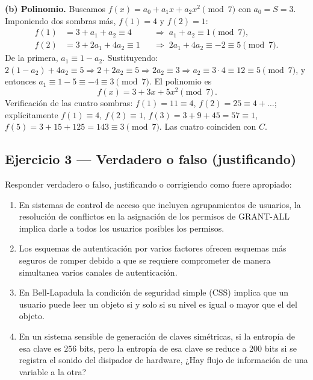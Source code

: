 \medskip
\textbf{(b) Polinomio.} Buscamos $f(x) = a_0 + a_1 x + a_2 x^2 \pmod 7$ con $a_0 = S = 3$.
Imponiendo dos sombras más, $f(1)=4$ y $f(2)=1$:
\begin{align*}
  f(1) &= 3 + a_1 + a_2 \equiv 4 &&\Rightarrow\; a_1 + a_2 \equiv 1 \pmod 7,\\
  f(2) &= 3 + 2a_1 + 4a_2 \equiv 1 &&\Rightarrow\; 2a_1 + 4a_2 \equiv -2 \equiv 5 \pmod 7.
\end{align*}
De la primera, $a_1 \equiv 1 - a_2$. Sustituyendo:
$2(1-a_2) + 4a_2 \equiv 5 \Rightarrow 2 + 2a_2 \equiv 5 \Rightarrow 2a_2 \equiv 3
\Rightarrow a_2 \equiv 3\cdot 4 \equiv 12 \equiv 5 \pmod 7$, y entonces
$a_1 \equiv 1 - 5 \equiv -4 \equiv 3 \pmod 7$. El polinomio es
\begin{equation}
  \boxed{\,f(x) = 3 + 3x + 5x^2 \pmod 7\,}.
\end{equation}
Verificación de las cuatro sombras: $f(1)=11\equiv4$, $f(2)=25\equiv4{+}\dots$;
explícitamente $f(1)\equiv 4$, $f(2)\equiv 1$, $f(3) = 3+9+45 = 57 \equiv 1$,
$f(5) = 3+15+125 = 143 \equiv 3 \pmod 7$. Las cuatro coinciden con $C$.

\subsection{Ejercicio 3 — Verdadero o falso (justificando)}

\begin{consigna}
Responder verdadero o falso, justificando o corrigiendo como fuere apropiado:
\begin{enumerate}
  \item[a)] En sistemas de control de acceso que incluyen agrupamientos de usuarios, la
  resolución de conflictos en la asignación de los permisos de GRANT-ALL implica darle a todos
  los usuarios posibles los permisos.
  \item[b)] Los esquemas de autenticación por varios factores ofrecen esquemas más seguros de
  romper debido a que se requiere comprometer de manera simultanea varios canales de
  autenticación.
  \item[c)] En Bell-Lapadula la condición de seguridad simple (CSS) implica que un usuario puede
  leer un objeto si y solo si su nivel es igual o mayor que el del objeto.
  \item[d)] En un sistema sensible de generación de claves simétricas, si la entropía de esa clave
  es $256$ bits, pero la entropía de esa clave se reduce a $200$ bits si se registra el sonido del
  disipador de hardware, ¿Hay flujo de información de una variable a la otra?
\end{enumerate}
\end{consigna}

